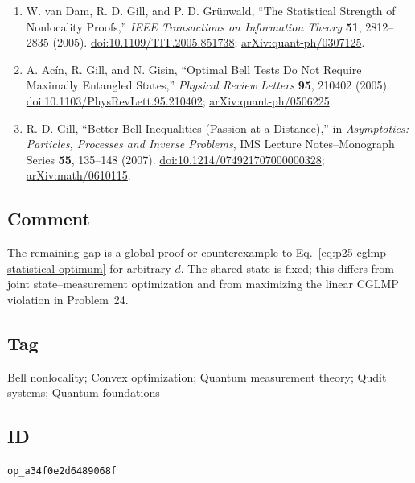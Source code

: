 \begin{enumerate}[label={},leftmargin=4.8em,labelsep=0.5em]
  \footnotesize
  \item[\textup{[DGG05]}]\label{ref:p25-statistical-strength}
  W. van Dam, R. D. Gill, and P. D. Grünwald,
  ``The Statistical Strength of Nonlocality Proofs,''
  \emph{IEEE Transactions on Information Theory} \textbf{51}, 2812--2835
  (2005).
  \href{https://doi.org/10.1109/TIT.2005.851738}{doi:10.1109/TIT.2005.851738};
  \href{https://arxiv.org/abs/quant-ph/0307125}{arXiv:quant-ph/0307125}.

  \item[\textup{[AGG05]}]\label{ref:p25-acin}
  A. Acín, R. Gill, and N. Gisin,
  ``Optimal Bell Tests Do Not Require Maximally Entangled States,''
  \emph{Physical Review Letters} \textbf{95}, 210402 (2005).
  \href{https://doi.org/10.1103/PhysRevLett.95.210402}{doi:10.1103/PhysRevLett.95.210402};
  \href{https://arxiv.org/abs/quant-ph/0506225}{arXiv:quant-ph/0506225}.

  \item[\textup{[Gil07]}]\label{ref:p25-gill}
  R. D. Gill, ``Better Bell Inequalities (Passion at a Distance),'' in
  \emph{Asymptotics: Particles, Processes and Inverse Problems}, IMS Lecture
  Notes--Monograph Series \textbf{55}, 135--148 (2007).
  \href{https://doi.org/10.1214/074921707000000328}{doi:10.1214/074921707000000328};
  \href{https://arxiv.org/abs/math/0610115}{arXiv:math/0610115}.
\end{enumerate}

\subsection*{Comment}

The remaining gap is a global proof or counterexample to
Eq.~\eqref{eq:p25-cglmp-statistical-optimum} for arbitrary $d$.  The shared
state is fixed; this differs from joint state--measurement optimization and
from maximizing the linear CGLMP violation in Problem~24.

\subsection*{Tag}

Bell nonlocality; Convex optimization; Quantum measurement theory; Qudit systems;
Quantum foundations

\subsection*{ID}

\texttt{op\_a34f0e2d6489068f}
